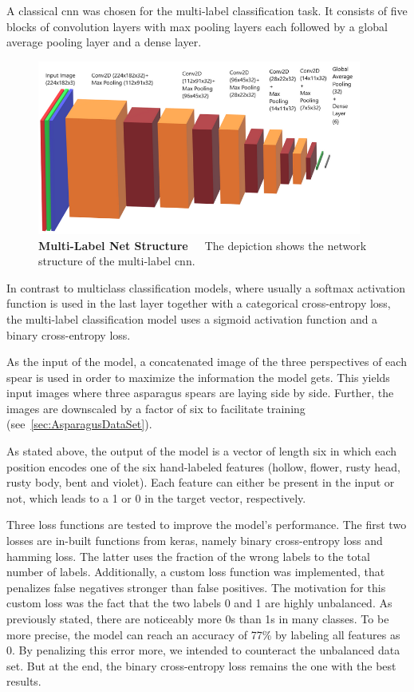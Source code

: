 \bigskip
A classical \acrshort{cnn} was chosen for the multi-label classification task. It consists of five blocks of convolution layers with max pooling layers each followed by a global average pooling layer and a dense layer.

\begin{figure}[!htb]
    \centering
    \includegraphics[width=0.95\textwidth]{Figures/chapter04/multilabel_net_structure.png}
    \decoRule
    \caption[Multi-Label Net Structure]{\textbf{Multi-Label Net Structure}~~~The depiction shows the network structure of the multi-label \acrshort{cnn}.}
    \label{tab:MultilabelNetStructure}
\end{figure}

In contrast to multiclass classification models, where usually a softmax activation function is used in the last layer together with a categorical cross-entropy loss, the multi-label classification model uses a sigmoid activation function and a binary cross-entropy loss.

As the input of the model, a concatenated image of the three perspectives of each spear is used in order to maximize the information the model gets. This yields input images where three asparagus spears are laying side by side. Further, the images are downscaled by a factor of six to facilitate training (see~\autoref{sec:AsparagusDataSet}).

As stated above, the output of the model is a vector of length six in which each position encodes one of the six hand-labeled features (hollow, flower, rusty head, rusty body, bent and violet). Each feature can either be present in the input or not, which leads to a 1 or 0 in the target vector, respectively.

Three loss functions are tested to improve the model's performance. The first two losses are in-built functions from keras, namely binary cross-entropy loss and hamming loss. The latter uses the fraction of the wrong labels to the total number of labels. Additionally, a custom loss function was implemented, that penalizes false negatives stronger than false positives. The motivation for this custom loss was the fact that the two labels 0 and 1 are highly unbalanced. As previously stated, there are noticeably more 0s than 1s in many classes. To be more precise, the model can reach an accuracy of 77\% by labeling all features as 0. By penalizing this error more, we intended to counteract the unbalanced data set. But at the end, the binary cross-entropy loss remains the one with the best results.

